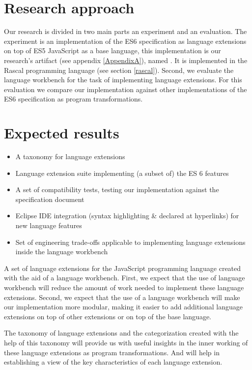 \section{Research approach}
Our research is divided in two main parts an experiment and an evaluation. The experiment is an implementation of the ES6 specification as language extensions on top of ES5 JavaScript as a base language, this implementation is our research's artifact (see appendix \ref{AppendixA}), named \textit{\projectname}. It is implemented in the Rascal programming language (see section \ref{rascal}). Second, we evaluate the language workbench for the task of implementing language extensions. For this evaluation we compare our implementation against other implementations of the ES6 specification as program transformations.

\section{Expected results}
\begin{itemize}
	\item A taxonomy for language extensions
	\item Language extension suite implementing (a subset of) the ES 6 features
	\item A set of compatibility tests, testing our implementation against the specification document
	\item Eclipse IDE integration (syntax highlighting \& declared at hyperlinks) for new language features
	\item Set of engineering trade-offs applicable to implementing language extensions inside the language workbench
\end{itemize}

A set of language extensions for the JavaScript programming language created with the aid of a language workbench. First, we expect that the use of language workbench will reduce the amount of work needed to implement these language extensions. Second, we expect that the use of a language workbench will make our implementation more modular, making it easier to add additional language extensions on top of other extensions or on top of the base language. 

The taxonomy of language extensions and the categorization created with the help of this taxonomy will provide us with useful insights in the inner working of these language extensions as program transformations. And will help in establishing a view of the key characteristics of each language extension.

